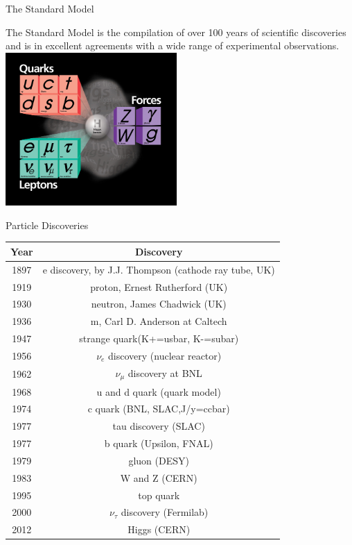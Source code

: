 \begin{frame}{The Standard Model}
\begin{center}
The Standard Model is the compilation of over 100 years of scientific discoveries and is in excellent agreements with a wide range of experimental observations.
\\
\vspace{1em}
    \includegraphics[width=0.49\textwidth]{images/standard_model_particles.jpg}
\end{center}
\end{frame}

\begin{frame}{Particle Discoveries}
  \begin{center}
    \footnotesize
\begin{tabular}{ | c | c |}
  \hline
  Year & Discovery \\ \hline \hline
  1897 & e discovery, by J.J. Thompson (cathode ray tube, UK)\\ \hline
  1919 & proton, Ernest Rutherford (UK)\\ \hline
  1930 & neutron, James Chadwick (UK)\\ \hline
  1936 & m, Carl D. Anderson at Caltech\\ \hline
  1947 & strange quark(K+=usbar, K-=subar)\\ \hline
  1956 & $\nu_e$ discovery (nuclear reactor)\\ \hline
  1962 & $\nu_{\mu}$ discovery at BNL\\ \hline
  1968 & u and d quark (quark model)\\ \hline
  1974 & c quark (BNL, SLAC,J/y=ccbar)\\ \hline
  1977 & tau discovery (SLAC)\\ \hline
  1977 & b quark (Upsilon, FNAL)\\ \hline
  1979 & gluon (DESY)\\ \hline
  1983 & W and Z (CERN) \\ \hline
  1995 & top quark \\ \hline
  2000 & $\nu_{\tau}$ discovery (Fermilab) \\ \hline \hline
  2012 & Higgs (CERN) \\ \hline
\end{tabular}
\end{center}
\end{frame}


